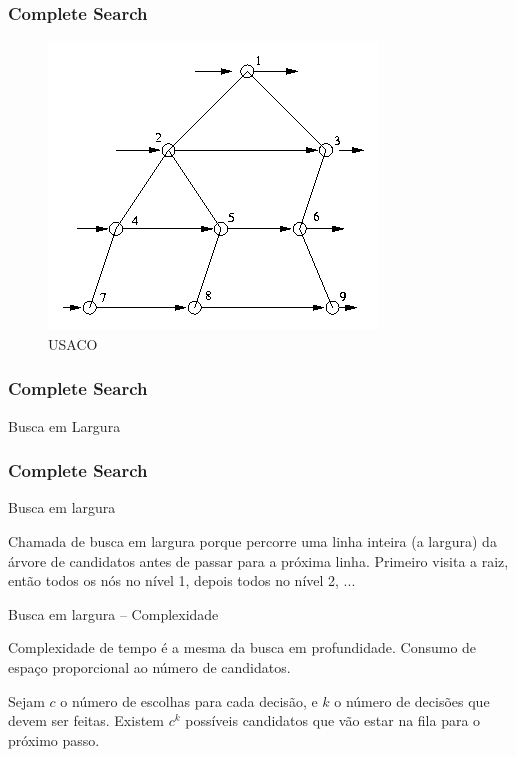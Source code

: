 \begin{frame}
\frametitle{Complete Search}
	\begin{center}
		\begin{figure}
			\includegraphics[width=.52\textwidth]{figuras/bfs.png}
			\caption{USACO}
		\end{figure}
	\end{center}
\end{frame}

\begin{frame}
\frametitle{Complete Search}
\begin{block}{Busca em Largura}
\end{block}
\end{frame}

\begin{frame}
\frametitle{Complete Search}
\begin{block}{Busca em largura}
\begin{itemize}
	\bitem Chamada de busca em largura porque percorre uma linha inteira (a largura) da árvore de candidatos antes de passar para a próxima linha.
	\bitem Primeiro visita a raiz, então todos os nós no nível 1, depois todos no nível 2, ...
\end{itemize}
\end{block}
\pause
\begin{block}{Busca em largura -- Complexidade}
\begin{itemize}
	\bitem Complexidade de tempo é a mesma da busca em profundidade.
	\bitem Consumo de espaço proporcional ao número de candidatos.
	\begin{itemize}
		\bitem Sejam $c$ o número de escolhas para cada decisão, e $k$ o número de decisões que devem ser feitas.
		\bitem Existem $c^k$ possíveis candidatos que vão estar na fila para o próximo passo.
	\end{itemize}
\end{itemize}
\end{block}
\end{frame}

